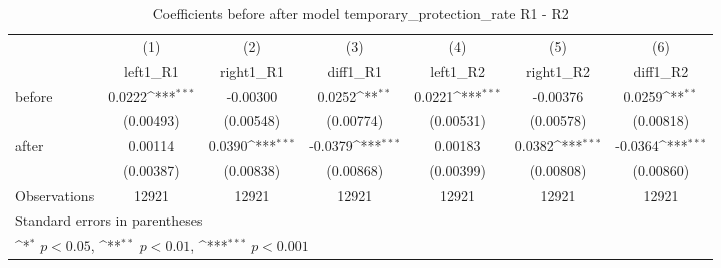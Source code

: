 \begin{table}[!ht]\centering \footnotesize
\def\sym#1{\ifmmode^{#1}\else\(^{#1}\)\fi}
\caption{Coefficients before after model temporary\_protection\_rate R1 - R2}
\begin{tabular}{l*{6}{c}}
\hline\hline
                    &\multicolumn{1}{c}{(1)}&\multicolumn{1}{c}{(2)}&\multicolumn{1}{c}{(3)}&\multicolumn{1}{c}{(4)}&\multicolumn{1}{c}{(5)}&\multicolumn{1}{c}{(6)}\\
                    &\multicolumn{1}{c}{left1\_R1}&\multicolumn{1}{c}{right1\_R1}&\multicolumn{1}{c}{diff1\_R1}&\multicolumn{1}{c}{left1\_R2}&\multicolumn{1}{c}{right1\_R2}&\multicolumn{1}{c}{diff1\_R2}\\
\hline
before              &      0.0222\sym{***}&    -0.00300         &      0.0252\sym{**} &      0.0221\sym{***}&    -0.00376         &      0.0259\sym{**} \\
                    &   (0.00493)         &   (0.00548)         &   (0.00774)         &   (0.00531)         &   (0.00578)         &   (0.00818)         \\
[1em]
after               &     0.00114         &      0.0390\sym{***}&     -0.0379\sym{***}&     0.00183         &      0.0382\sym{***}&     -0.0364\sym{***}\\
                    &   (0.00387)         &   (0.00838)         &   (0.00868)         &   (0.00399)         &   (0.00808)         &   (0.00860)         \\
\hline
Observations        &       12921         &       12921         &       12921         &       12921         &       12921         &       12921         \\
\hline\hline
\multicolumn{7}{l}{\footnotesize Standard errors in parentheses}\\
\multicolumn{7}{l}{\footnotesize \sym{*} \(p<0.05\), \sym{**} \(p<0.01\), \sym{***} \(p<0.001\)}\\
\end{tabular}
\end{table}
